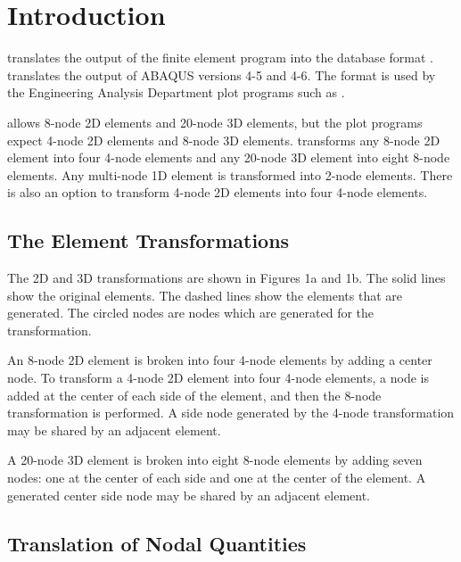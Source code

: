 \chapter{Introduction} \label{chap:intro}

\caps{\PROGRAM} translates the output of the  finite element
program \cite{bib:abaqus} into the  database format
\cite{bib:exodus}.  translates the output of ABAQUS versions
4-5 and 4-6.
The  format is used by the
Engineering Analysis Department plot programs such as 
\cite{bib:blot}. 

 allows 8-node 2D elements and 20-node 3D elements, but the
plot programs expect 4-node 2D elements and 8-node 3D elements.
\caps{\PROGRAM} transforms any 8-node 2D element into four 4-node
elements and any 20-node 3D element into eight 8-node elements. Any
multi-node 1D element is transformed into 2-node elements. There is also
an option to transform 4-node 2D elements into four 4-node elements.

\section{The Element Transformations} \label{intro:trans}

The 2D and 3D transformations are shown in Figures 1a and 1b. The solid
lines show the original elements. The dashed lines show the elements
that are generated. The circled nodes are nodes which are generated for
the transformation.

An 8-node 2D element is broken into four 4-node elements by adding a
center node. To transform a 4-node 2D element into four 4-node elements,
a node is added at the center of each side of the element, and then the
8-node transformation is performed. A side node generated by the 4-node
transformation may be shared by an adjacent element.

A 20-node 3D element is broken into eight 8-node elements by adding
seven nodes: one at the center of each side and one at the center of the
element. A generated center side node may be shared by an adjacent
element.

\newpage \addtocounter{page}{1}

\newcommand{\nodenum}[1] {\em #1}

\section{Translation of Nodal Quantities} \label{intro:nodal}

